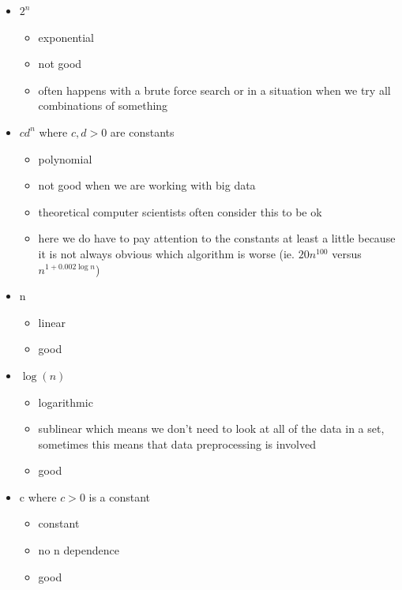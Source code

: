 \begin{itemize}
    \item $2^n$
    \begin{itemize}
        \item exponential
        \item not good
        \item often happens with a brute force search or in a situation when we try all combinations of something
    \end{itemize}
    \item $cd^n$ where $c, d > 0$ are constants
    \begin{itemize}
        \item polynomial
        \item not good when we are working with big data
        \item theoretical computer scientists often consider this to be ok
        \item here we do have to pay attention to the constants at least a little because it is not always obvious which algorithm is worse (ie. $20n^{100}$ versus $n^{1+0.002\log n}$)
    \end{itemize}
    \item n
    \begin{itemize}
        \item linear
        \item good
    \end{itemize}
    \item $\log(n)$
    \begin{itemize}
        \item logarithmic
        \item sublinear which means we don't need to look at all of the data in a set, sometimes this means that data preprocessing is involved
        \item good
    \end{itemize}
    \item c where $c>0$ is a constant
    \begin{itemize}
        \item constant
        \item no n dependence
        \item good
    \end{itemize}
\end{itemize}

